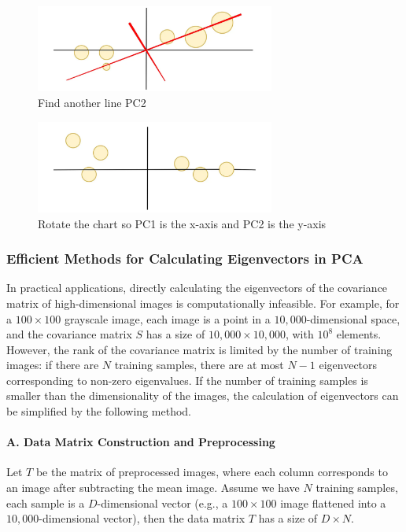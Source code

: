 \documentclass{article}
\begin{document}
\begin{figure}[H]
    \centering
    \includegraphics[width=0.7\textwidth]{Img/1_oRj5G874ukOev-uLrsq7LQ.png}
    \caption{Find another line PC2}
\end{figure}

\begin{figure}[H]
    \centering
    \includegraphics[width=0.7\textwidth]{Img/1_juLo2GtiuLdHhJOaNljyqw.png}
    \caption{Rotate the chart so PC1 is the x-axis and PC2 is the y-axis}
\end{figure}

\subsubsection{Efficient Methods for Calculating Eigenvectors in PCA}
In practical applications, directly calculating the eigenvectors of the covariance matrix of high-dimensional images is computationally infeasible. For example, for a \( 100 \times 100 \) grayscale image, each image is a point in a \( 10,000 \)-dimensional space, and the covariance matrix \( S \) has a size of \( 10,000 \times 10,000 \), with \( 10^8 \) elements. However, the rank of the covariance matrix is limited by the number of training images: if there are \( N \) training samples, there are at most \( N - 1 \) eigenvectors corresponding to non-zero eigenvalues. If the number of training samples is smaller than the dimensionality of the images, the calculation of eigenvectors can be simplified by the following method.

\paragraph{A. Data Matrix Construction and Preprocessing}
Let \( T \) be the matrix of preprocessed images, where each column corresponds to an image after subtracting the mean image. Assume we have \( N \) training samples, each sample is a \( D \)-dimensional vector (e.g., a \( 100 \times 100 \) image flattened into a \( 10,000 \)-dimensional vector), then the data matrix \( T \) has a size of \( D \times N \).
\end{document}
